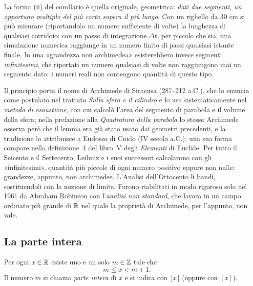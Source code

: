 \begin{idea}
La forma (ii) del corollario è quella originale, geometrica: \emph{dati due segmenti, un
opportuno multiplo del più corto supera il più lungo}. Con un righello da $30$ cm si può
misurare (riportandolo un numero sufficiente di volte) la lunghezza di qualsiasi
corridoio; con un passo di integrazione $\Delta t$, per piccolo che sia, una simulazione
numerica raggiunge in un numero finito di passi qualsiasi istante finale. In una
«grandezza non archimedea» esisterebbero invece segmenti \emph{infinitesimi}, che
riportati un numero qualsiasi di volte non raggiungono mai un segmento dato: i numeri
reali non contengono quantità di questo tipo.
\end{idea}

\begin{notastorica}
Il principio porta il nome di Archimede di Siracusa (287--212 a.C.), che lo enuncia come
postulato nel trattato \emph{Sulla sfera e il cilindro} e lo usa sistematicamente nel
\emph{metodo di esaustione}, con cui calcolò l'area del segmento di parabola e il volume
della sfera; nella prefazione alla \emph{Quadratura della parabola} lo stesso Archimede
osserva però che il lemma era già stato usato dai geometri precedenti, e la tradizione
lo attribuisce a Eudosso di Cnido (IV secolo a.C.); una sua forma compare nella definizione~4 del libro~V degli \emph{Elementi} di Euclide.
Per tutto il Seicento e il Settecento, Leibniz e i suoi successori calcolarono con gli
«infinitesimi», quantità più piccole di ogni numero positivo eppure non nulle: grandezze,
appunto, non archimedee. L'Analisi dell'Ottocento li bandì, sostituendoli con la nozione
di limite. Furono riabilitati in modo rigoroso solo nel 1961 da Abraham Robinson con
l'\emph{analisi non standard}, che lavora in un campo ordinato più grande di $\mathbb{R}$ nel quale
la proprietà di Archimede, per l'appunto, non vale.
\end{notastorica}

\subsection{La parte intera}

\begin{proposizione}\label{prop:parte-intera}
Per ogni $x\in\mathbb{R}$ esiste uno e un solo $m\in\mathbb{Z}$ tale che
\begin{equation}\label{eq:parte-intera}
  m\le x<m+1.
\end{equation}
Il numero $m$ si chiama \emph{parte intera} di $x$ e si indica con $\lfloor x\rfloor$
(oppure con $[x]$).
\end{proposizione}

